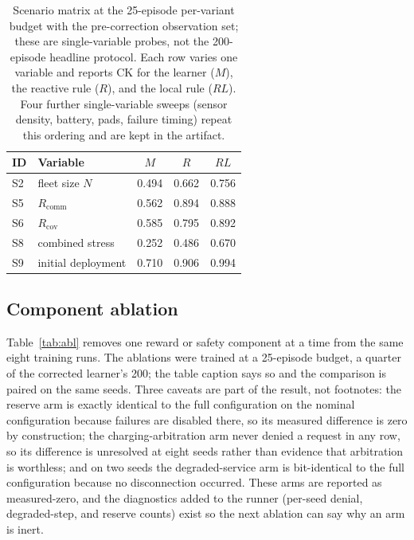 \documentclass[conference]{IEEEtran}
\newcommand{\ck}{\mathrm{CK}}
\begin{document}
\begin{table}[t]
\caption{Scenario matrix at the 25-episode per-variant budget with the pre-correction observation set; these are single-variable probes, not the 200-episode headline protocol. Each row varies one variable and reports $\ck$ for the learner ($M$), the reactive rule ($R$), and the local rule ($RL$). Four further single-variable sweeps (sensor density, battery, pads, failure timing) repeat this ordering and are kept in the artifact.}
\label{tab:scen}
\centering
\small
\setlength{\tabcolsep}{2.5pt}
\begin{tabular}{@{}llccc@{}}
\toprule
ID & Variable & $M$ & $R$ & $RL$ \\
\midrule
S2 & fleet size $N$ & 0.494 & 0.662 & 0.756 \\
S5 & $R_{\mathrm{comm}}$ & 0.562 & 0.894 & 0.888 \\
S6 & $R_{\mathrm{cov}}$ & 0.585 & 0.795 & 0.892 \\
S8 & combined stress & 0.252 & 0.486 & 0.670 \\
S9 & initial deployment & 0.710 & 0.906 & 0.994 \\
\bottomrule
\end{tabular}
\end{table}

\subsection{Component ablation}
Table~\ref{tab:abl} removes one reward or safety component at a time from the same eight training runs. The ablations were trained at a 25-episode budget, a quarter of the corrected learner's 200; the table caption says so and the comparison is paired on the same seeds. Three caveats are part of the result, not footnotes: the reserve arm is exactly identical to the full configuration on the nominal configuration because failures are disabled there, so its measured difference is zero by construction; the charging-arbitration arm never denied a request in any row, so its difference is unresolved at eight seeds rather than evidence that arbitration is worthless; and on two seeds the degraded-service arm is bit-identical to the full configuration because no disconnection occurred. These arms are reported as measured-zero, and the diagnostics added to the runner (per-seed denial, degraded-step, and reserve counts) exist so the next ablation can say why an arm is inert.
\end{document}
